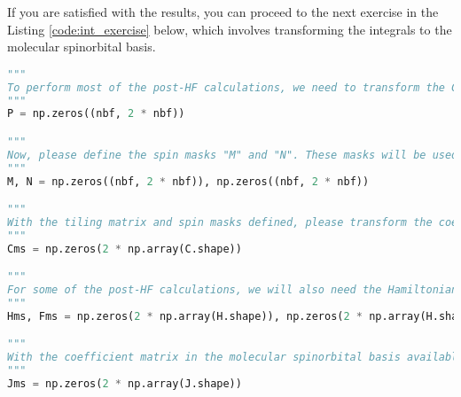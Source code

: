 If you are satisfied with the results, you can proceed to the next exercise in the Listing \ref{code:int_exercise} below, which involves transforming the integrals to the molecular spinorbital basis.

\raggedbottom\begin{lstlisting}[language=Python, caption={Integral transform exercise code.}, label=code:int_exercise]
"""
To perform most of the post-HF calculations, we need to transform the Coulomb integrals to the molecular spinorbital basis, so if you don't plan to calculate any post-HF methods, you can end the eercise here. The restricted MP2 calculation could be done using the Coulomb integral in MO basis, but for the sake of subsequent calculations, we enforce here the integrals in the MS basis. The first thing you will need for the transform is the coefficient matrix in the molecular spinorbital basis. To perform this transform using the mathematical formulation presented in the materials, the first step is to form the tiling matrix "P" which will be used to duplicate columns of a general matrix. Please define it here.
"""
P = np.zeros((nbf, 2 * nbf))

"""
Now, please define the spin masks "M" and "N". These masks will be used to zero out spinorbitals, that should be empty.
"""
M, N = np.zeros((nbf, 2 * nbf)), np.zeros((nbf, 2 * nbf))

"""
With the tiling matrix and spin masks defined, please transform the coefficient matrix into the molecular spinorbital basis. The resulting matrix should be stored in the "Cms" variable.
"""
Cms = np.zeros(2 * np.array(C.shape))

"""
For some of the post-HF calculations, we will also need the Hamiltonian and Fock matrix in the molecular spinorbital basis. Please transform it and store it in the "Hms" and "Fms" variable. If you don't plan to calculate the CCSD method, you can skip the transformation of the Fock matrix, as it is not needed for the MP2 and CI calculations.
"""
Hms, Fms = np.zeros(2 * np.array(H.shape)), np.zeros(2 * np.array(H.shape))

"""
With the coefficient matrix in the molecular spinorbital basis available, we can proceed to transform the Coulomb integrals. It is important to note that the transformed integrals will contain twice as many elements along each axis compared to their counterparts in the atomic orbital (AO) basis. This increase is due to the representation of both spin states in the molecular spinorbital basis.
"""
Jms = np.zeros(2 * np.array(J.shape))


\end{lstlisting}
